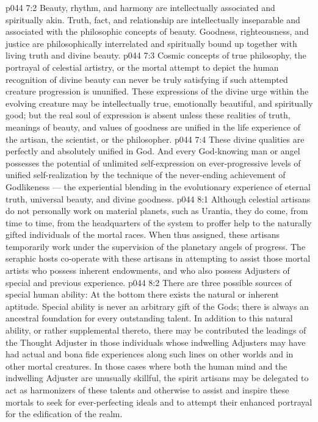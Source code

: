 \vs p044 7:2 Beauty, rhythm, and harmony are intellectually associated and spiritually akin. Truth, fact, and relationship are intellectually inseparable and associated with the philosophic concepts of beauty. Goodness, righteousness, and justice are philosophically interrelated and spiritually bound up together with living truth and divine beauty.
\vs p044 7:3 Cosmic concepts of true philosophy, the portrayal of celestial artistry, or the mortal attempt to depict the human recognition of divine beauty can never be truly satisfying if such attempted creature progression is ununified. These expressions of the divine urge within the evolving creature may be intellectually true, emotionally beautiful, and spiritually good; but the real soul of expression is absent unless these realities of truth, meanings of beauty, and values of goodness are unified in the life experience of the artisan, the scientist, or the philosopher.
\vs p044 7:4 These divine qualities are perfectly and absolutely unified in God. And every God\hyp{}knowing man or angel possesses the potential of unlimited self\hyp{}expression on ever\hyp{}progressive levels of unified self\hyp{}realization by the technique of the never\hyp{}ending achievement of Godlikeness --- the experiential blending in the evolutionary experience of eternal truth, universal beauty, and divine goodness.
\vs p044 8:1 Although celestial artisans do not personally work on material planets, such as Urantia, they do come, from time to time, from the headquarters of the system to proffer help to the naturally gifted individuals of the mortal races. When thus assigned, these artisans temporarily work under the supervision of the planetary angels of progress. The seraphic hosts co\hyp{}operate with these artisans in attempting to assist those mortal artists who possess inherent endowments, and who also possess Adjusters of special and previous experience.
\vs p044 8:2 There are three possible sources of special human ability: At the bottom  there exists the natural or inherent aptitude. Special ability is never an arbitrary gift of the Gods; there is always an ancestral foundation for every outstanding talent. In addition to this natural ability, or rather supplemental thereto, there may be contributed the leadings of the Thought Adjuster in those individuals whose indwelling Adjusters may have had actual and bona fide experiences along such lines on other worlds and in other mortal creatures. In those cases where both the human mind and the indwelling Adjuster are unusually skillful, the spirit artisans may be delegated to act as harmonizers of these talents and otherwise to assist and inspire these mortals to seek for ever\hyp{}perfecting ideals and to attempt their enhanced portrayal for the edification of the realm.
